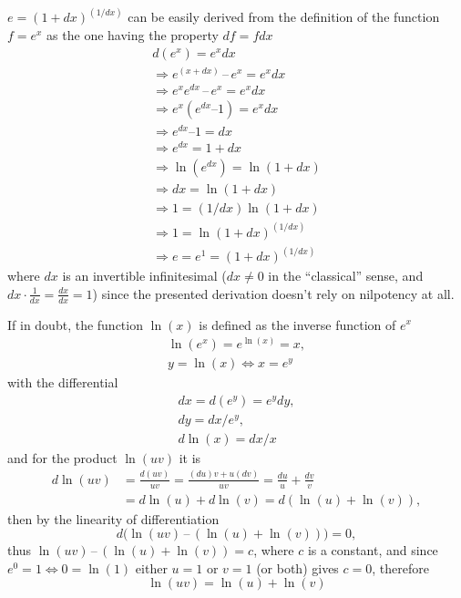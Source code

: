 \documentclass[11pt, twoside]{book}
\begin{document}
$e = (1 + dx)^{(1/dx)}$ can be easily derived from the definition of the function $f = e^x$ as the one having the property $df = fdx$
\begin{gather*}
d (e^x) = e^x dx \\
\Rightarrow e^{(x + dx)} \, – \, e^x = e^x dx \\
\Rightarrow e^x e^{dx} \, – \, e^x = e^x dx \\
\Rightarrow e^x (e^{dx} – 1) = e^x dx \\
\Rightarrow e^{dx} – 1 = dx \\
\Rightarrow e^{dx} = 1 + dx \\
\Rightarrow \operatorname{ln}(e^{dx}) = \operatorname{ln}(1 + dx) \\
\Rightarrow dx = \operatorname{ln}(1 + dx) \\
\Rightarrow 1 = (1/dx)\operatorname{ln}(1 + dx) \\
\Rightarrow 1 = \operatorname{ln}(1 + dx)^{(1/dx)} \\
\Rightarrow e = e^1 = (1 + dx)^{(1/dx)}
\end{gather*}
where $dx$ is an invertible infinitesimal ($dx \!\neq\! 0$ in the “classical” sense, and $dx \cdot \frac{1}{dx} = \frac{dx}{dx} = 1$) since the presented derivation doesn’t rely on nilpotency at all.

If in doubt, the function $\operatorname{ln}(x)$ is defined as the inverse function of $e^x$
\begin{gather*}
\operatorname{ln}(e^x) = e^{\operatorname{ln}(x)} = x,\\
y = \operatorname{ln}(x) \Leftrightarrow x = e^y
\end{gather*}
with the differential
\begin{gather*}
dx = d(e^y) = e^y dy,\\
dy = dx/e^y,\\
d \operatorname{ln}(x) = dx / x
\end{gather*}
and for the product $\operatorname{ln}(uv)$ it is
\begin{equation*}\begin{split}
d \operatorname{ln}(uv) & = \frac{d(uv)}{uv}
= \frac{ (du)v + u(dv) }{uv}
= \frac{du}{u} + \frac{dv}{v} \\
& = d \operatorname{ln}(u) + d \operatorname{ln}(v)
= d( \operatorname{ln}(u) + \operatorname{ln}(v) ),
\end{split}\end{equation*}
then by the linearity of differentiation
\begin{equation*}
d \bigl( \operatorname{ln}(uv) \, – \, (\operatorname{ln}(u) + \operatorname{ln}(v)) \bigr) = 0,
\end{equation*}
thus $\operatorname{ln}(uv) \, – \, (\operatorname{ln}(u) + \operatorname{ln}(v)) = c$, where $c$ is a constant,
and since $e^0 = 1 \Leftrightarrow 0 = \operatorname{ln}(1)$ either $u=1$ or $v=1$ (or both) gives $c=0$,
therefore
\begin{equation*}
\operatorname{ln}(uv) = \operatorname{ln}(u) + \operatorname{ln}(v)
\end{equation*}
\end{document}

